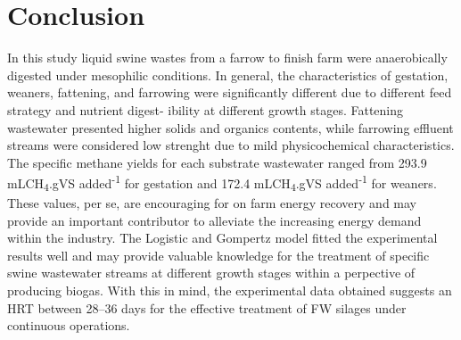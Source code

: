 \section{Conclusion}
In this study liquid swine wastes from a farrow to finish farm were anaerobically digested under mesophilic conditions. In general, the characteristics of gestation, weaners, fattening, and farrowing were significantly different due to different feed strategy and nutrient digest- ibility at different growth stages. Fattening wastewater presented higher solids and organics contents, while farrowing effluent streams were considered low strenght due to mild physicochemical characteristics. The specific methane yields for each substrate wastewater ranged from 293.9 mLCH\textsubscript{4}.gVS added\textsuperscript{-1} for gestation and 172.4 mLCH\textsubscript{4}.gVS added\textsuperscript{-1} for weaners. These values, per se, are encouraging for on farm energy recovery and may provide an important contributor to alleviate the increasing energy demand within the industry. The Logistic and Gompertz model fitted the experimental results well and may provide valuable knowledge for the treatment of specific swine wastewater streams at different growth stages within a perpective of producing biogas. With this in mind, the experimental data obtained suggests an HRT between 28–36 days for the effective treatment of FW silages under continuous operations. 
